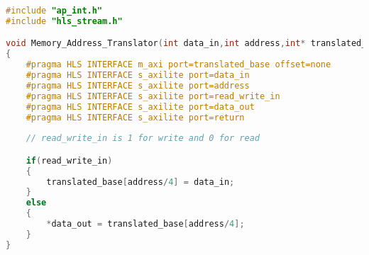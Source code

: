 \singlespacing
\scriptsize
\begin{lstlisting}[language=C++, caption=Memory Address Translator HLS, label={lst:MAT}]
#include "ap_int.h"
#include "hls_stream.h"

void Memory_Address_Translator(int data_in,int address,int* translated_base,...,int *data_out)
{
	#pragma HLS INTERFACE m_axi port=translated_base offset=none
	#pragma HLS INTERFACE s_axilite port=data_in
	#pragma HLS INTERFACE s_axilite port=address
	#pragma HLS INTERFACE s_axilite port=read_write_in
	#pragma HLS INTERFACE s_axilite port=data_out
	#pragma HLS INTERFACE s_axilite port=return
	
	// read_write_in is 1 for write and 0 for read

	if(read_write_in)
	{
		translated_base[address/4] = data_in;
	}
	else
	{
		*data_out = translated_base[address/4];
	}
}
\end{lstlisting}
\normalsize
\doublespacing
